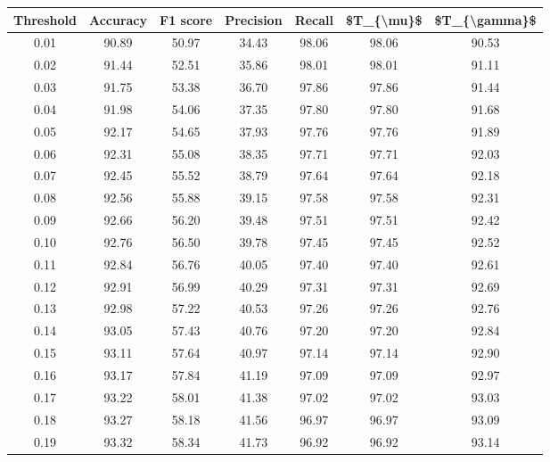\begin{tabular}{|c|c|c|c|c|c|c|}
\hline
 Threshold &  Accuracy &  F1 score &  Precision &  Recall &  \$T\_\{\textbackslash mu\}\$ &  \$T\_\{\textbackslash gamma\}\$ \\
\hline
      0.01 &     90.89 &     50.97 &      34.43 &   98.06 &      98.06 &         90.53 \\
      0.02 &     91.44 &     52.51 &      35.86 &   98.01 &      98.01 &         91.11 \\
      0.03 &     91.75 &     53.38 &      36.70 &   97.86 &      97.86 &         91.44 \\
      0.04 &     91.98 &     54.06 &      37.35 &   97.80 &      97.80 &         91.68 \\
      0.05 &     92.17 &     54.65 &      37.93 &   97.76 &      97.76 &         91.89 \\
      0.06 &     92.31 &     55.08 &      38.35 &   97.71 &      97.71 &         92.03 \\
      0.07 &     92.45 &     55.52 &      38.79 &   97.64 &      97.64 &         92.18 \\
      0.08 &     92.56 &     55.88 &      39.15 &   97.58 &      97.58 &         92.31 \\
      0.09 &     92.66 &     56.20 &      39.48 &   97.51 &      97.51 &         92.42 \\
      0.10 &     92.76 &     56.50 &      39.78 &   97.45 &      97.45 &         92.52 \\
      0.11 &     92.84 &     56.76 &      40.05 &   97.40 &      97.40 &         92.61 \\
      0.12 &     92.91 &     56.99 &      40.29 &   97.31 &      97.31 &         92.69 \\
      0.13 &     92.98 &     57.22 &      40.53 &   97.26 &      97.26 &         92.76 \\
      0.14 &     93.05 &     57.43 &      40.76 &   97.20 &      97.20 &         92.84 \\
      0.15 &     93.11 &     57.64 &      40.97 &   97.14 &      97.14 &         92.90 \\
      0.16 &     93.17 &     57.84 &      41.19 &   97.09 &      97.09 &         92.97 \\
      0.17 &     93.22 &     58.01 &      41.38 &   97.02 &      97.02 &         93.03 \\
      0.18 &     93.27 &     58.18 &      41.56 &   96.97 &      96.97 &         93.09 \\
      0.19 &     93.32 &     58.34 &      41.73 &   96.92 &      96.92 &         93.14 \\

\end{tabular}
